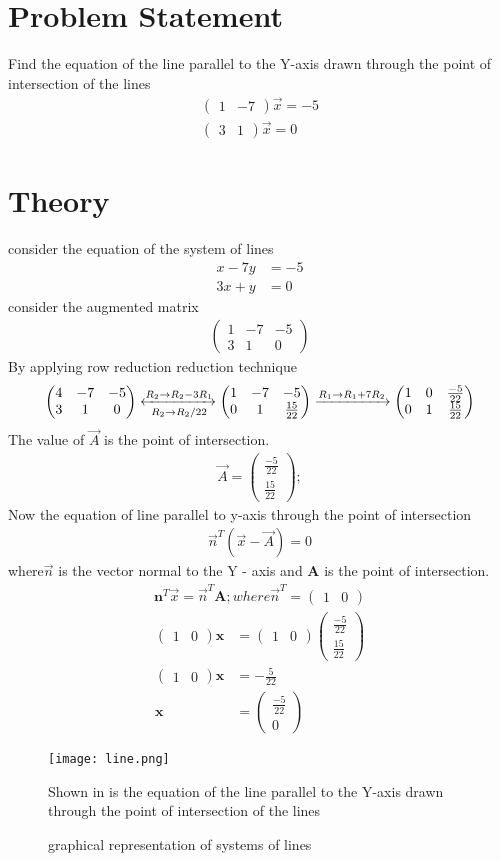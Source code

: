 \documentclass{article}
\renewcommand{\vec}[1]{\mathbf{#1}}
\newcommand{\myvec}[1]{\ensuremath{\begin{pmatrix}#1\end{pmatrix}}}
\begin{document}
\section{Problem Statement}
Find the equation of the line parallel to the Y-axis drawn through the point of intersection of the lines
\begin{align}
\myvec{1 & -7}\Vec{x}  =-5 \\ \myvec{3 & 1}\Vec{x}= 0
\end{align}
\section{Theory}
consider the equation of the system of lines
\begin{align}
x - 7y & = -5 \\
3x + y & = 0
\end{align}
 consider the augmented matrix
 \begin{align}
 \myvec{1 & -7 & -5 \\ 3 & 1 & 0}
 \end{align}
 By applying row reduction reduction technique 
 \begin{align}
\myvec{4 & -7 & -5\\ 3 & 1 & 0}
	\xleftrightarrow[R_2 \rightarrow R_2/22]{R_2 \rightarrow R_2-3R_1}
	\myvec{1 & -7 & -5 \\ 0 & 1 & \frac{15}{22}}
	\xrightarrow[]{R_1 \rightarrow R_1+7R_2}
	 \myvec{1 & 0 & \frac{-5}{22} \\ 0 & 1 & \frac{15}{22}}
 \end{align}
 The value of $\Vec{A}$ is the point of intersection.
\begin{align}
 {\Vec{A}} = \myvec{\frac{-5}{22} \\ \frac{15}{22}} ;
\end{align}
Now the equation of line parallel to y-axis through the point of intersection
\begin{align}
\Vec{n}^T(\Vec{x}-\Vec{A}) = 0
\end{align}
where$\Vec{n}$ is the vector normal to the Y - axis and $\vec{A}$ is the point of intersection.\\
\begin{align*}
\vec{n}^T \Vec{x} = \Vec{n}^T\vec{A} ; where
 \Vec{n}^T = \myvec{1 & 0}
 \end{align*}
 \begin{align}
\myvec{1 & 0}\vec{x} &  = \myvec{1 & 0} \myvec{\frac{-5}{22} \\ \frac{15}{22}}\\
\myvec{1 & 0}\vec{x} & = -\frac{5}{22}\\
\vec{x} & = \myvec{\frac{-5}{22} \\ 0} 
 \end{align}
 \begin{figure}
 \centering
 \texttt{[image: line.png]}
 \caption{graphical representation of systems of lines}
 \label{fig:lines}
 Shown in  is the equation of the line parallel to the Y-axis drawn through the point of intersection of the lines 
 \end{figure}
\end{document}
